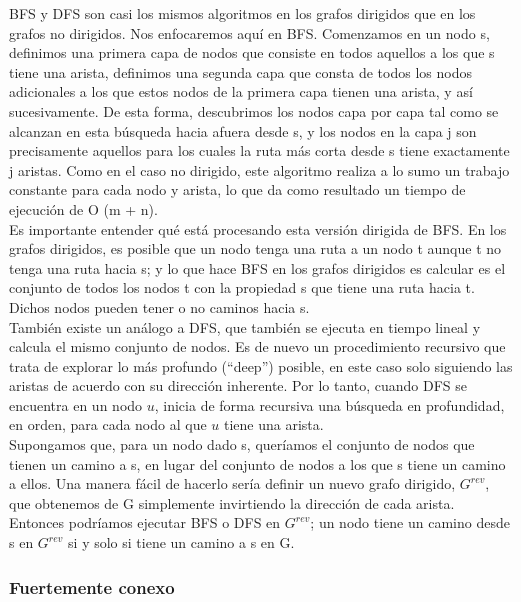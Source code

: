 \documentclass[a4paper, 12pt]{book}
\theoremstyle{dotless}
\begin{document}
BFS y DFS son casi los mismos algoritmos en los grafos dirigidos que en los grafos no dirigidos. Nos enfocaremos aquí en BFS. Comenzamos en un nodo s, definimos una primera capa de nodos que consiste en todos aquellos a los que s tiene una arista, definimos una segunda capa que consta de todos los nodos adicionales a los que estos nodos de la primera capa tienen una arista, y así sucesivamente. De esta forma, descubrimos los nodos capa por capa tal como se alcanzan en esta búsqueda hacia afuera desde s, y los nodos en la capa j son precisamente aquellos para los cuales la ruta más corta desde s tiene exactamente j aristas. Como en el caso no dirigido, este algoritmo realiza a lo sumo un trabajo constante para cada nodo y arista, lo que da como resultado un tiempo de ejecución de O (m + n).\\

Es importante entender qué está procesando esta versión dirigida de BFS. En los grafos dirigidos, es posible que un nodo tenga una ruta a un nodo t aunque t no tenga una ruta hacia s; y lo que hace BFS en los grafos dirigidos es calcular es el conjunto de todos los nodos t con la propiedad s que tiene una ruta hacia t. Dichos nodos pueden tener o no caminos hacia s.\\

También existe un análogo a DFS, que también se ejecuta en tiempo lineal y calcula el mismo conjunto de nodos. Es de nuevo un procedimiento recursivo que trata de explorar lo más profundo (``deep'') 
posible, en este caso solo siguiendo las aristas de acuerdo con su dirección inherente. Por lo tanto, cuando DFS se encuentra en un nodo $u$, inicia de forma recursiva una búsqueda en profundidad, en orden, para cada nodo al que $u$ tiene una arista.\\

Supongamos que, para un nodo dado s, queríamos el conjunto de nodos que tienen un camino a s, en lugar del conjunto de nodos a los que s tiene un camino a ellos. Una manera fácil de hacerlo sería definir un nuevo grafo dirigido, $G^{rev}$, que obtenemos de G simplemente invirtiendo la dirección de cada arista. Entonces podríamos ejecutar BFS o DFS en $G^{rev}$; un nodo tiene un camino desde s en $G^{rev}$ si y solo si tiene un camino a s en G.\\

\subsubsection*{Fuertemente conexo}
\end{document}
